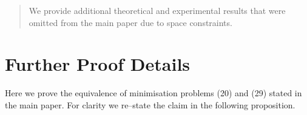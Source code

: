 \graphicspath{{figures_addendum/}}

\begin{abstract}
  We provide additional theoretical and experimental results that were
  omitted from the main paper due to space constraints.
\end{abstract}

\section{Further Proof Details}

Here we prove the equivalence of minimisation problems (20) and (29)
stated in the main paper. For clarity we re--state the claim in the
following proposition.

\newcommand\Slack{\xi}
\newcommand\Slacks{\vec{\Slack}}

